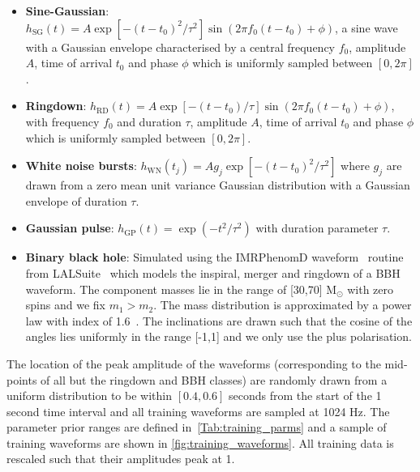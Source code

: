 \documentclass[12pt]{iopart}
\begin{document}
%
\begin{itemize}
%
\item {\bf Sine-Gaussian}: $h_{\text{SG}}(t) = A \exp\left[ - (t-t_{0})^2 /
\tau^2 \right] \sin (2 \pi f_0 (t-t_0) + \phi)$, a sine wave with a Gaussian envelope characterised by a central frequency $f_0$, amplitude $A$, time of arrival $t_{0}$ and phase $\phi$ which is uniformly sampled between $[0, 2\pi]$.
%
\item {\bf Ringdown}: $h_{\text{RD}}(t) = A \exp \left[-{(t-t_0)} / {\tau}
\right] \sin(2 \pi f_0 (t-t_0) + \phi)$, with frequency $f_0$ and duration $\tau$, amplitude $A$, time of arrival $t_{0}$ and phase $\phi$ which is uniformly sampled between $[0, 2\pi]$. 
%
\item {\bf White noise bursts}: $h_{\text{WN}}(t_j) = Ag_j\exp\left[ -
(t-t_{0})^2 / \tau^2 \right]$ where $g_j$ are drawn from a zero mean unit
variance Gaussian distribution with a Gaussian envelope of duration $\tau$.
%
\item {\bf Gaussian pulse}: $h_{\text{GP}}(t) = \exp(-t^2 / \tau^2)$ with
duration parameter $\tau$.
%
\item {\bf Binary black hole}: Simulated using the IMRPhenomD
waveform~\cite{Khan_2016} routine from LALSuite~\cite{lalsuite} which models
the inspiral, merger and ringdown of a \ac{BBH} waveform. The component masses
lie in the range of [30,70] $\textrm{M}_{\odot}$ with zero spins and we fix
$m_1>m_2$. The mass distribution is approximated by a power law with
index of 1.6~\cite{Abbott_2019}. The inclinations are drawn
such that the cosine of the angles lies uniformly in the range [-1,1] and we only use the plus polarisation.
%
\end{itemize}
%
The location of the peak amplitude of the waveforms (corresponding to the
mid-points of all but the ringdown and \ac{BBH} classes) are randomly drawn from a uniform distribution to
be within $[0.4, 0.6]$ seconds from the start of the 1 second time interval and all
training waveforms are sampled at 1024 Hz.  The parameter prior ranges are
defined in~\cref{Tab:training_parms} and a sample of training waveforms are shown in \cref{fig:training_waveforms}. All training data is rescaled such that their amplitudes peak at 1.
\end{document}
